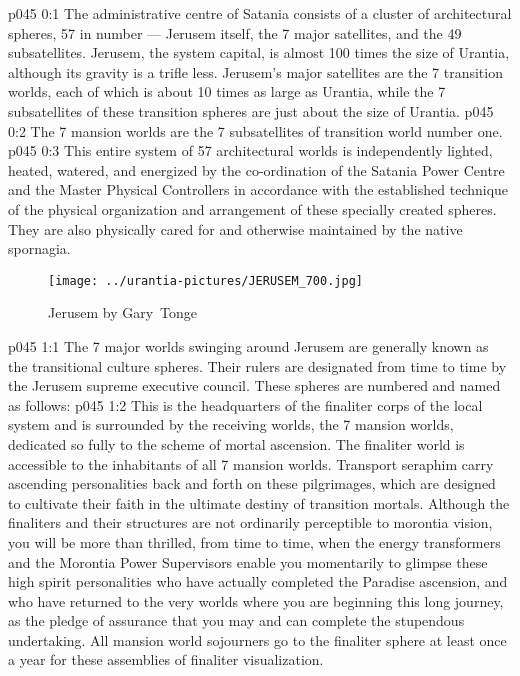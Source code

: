 \author{Melchizedek}
\vs p045 0:1 The administrative centre of Satania consists of a cluster of architectural spheres, 57 in number --- Jerusem itself, the 7 major satellites, and the 49 subsatellites. Jerusem, the system capital, is almost 100 times the size of Urantia, although its gravity is a trifle less. Jerusem’s major satellites are the 7 transition worlds, each of which is about 10 times as large as Urantia, while the 7 subsatellites of these transition spheres are just about the size of Urantia.
\vs p045 0:2 The 7 mansion worlds are the 7 subsatellites of transition world number one.
\vs p045 0:3 This entire system of 57 architectural worlds is independently lighted, heated, watered, and energized by the co\hyp{}ordination of the Satania Power Centre and the Master Physical Controllers in accordance with the established technique of the physical organization and arrangement of these specially created spheres. They are also physically cared for and otherwise maintained by the native spornagia.
\begin{figure}[H]
\centering
\texttt{[image: ../urantia-pictures/JERUSEM\_700.jpg]}
\caption{Jerusem by Gary~Tonge}
\end{figure}
\vs p045 1:1 The 7 major worlds swinging around Jerusem are generally known as the transitional culture spheres. Their rulers are designated from time to time by the Jerusem supreme executive council. These spheres are numbered and named as follows:
\vs p045 1:2 \pc {} This is the headquarters of the finaliter corps of the local system and is surrounded by the receiving worlds, the 7 mansion worlds, dedicated so fully to the scheme of mortal ascension. The finaliter world is accessible to the inhabitants of all 7 mansion worlds. Transport seraphim carry ascending personalities back and forth on these pilgrimages, which are designed to cultivate their faith in the ultimate destiny of transition mortals. Although the finaliters and their structures are not ordinarily perceptible to morontia vision, you will be more than thrilled, from time to time, when the energy transformers and the Morontia Power Supervisors enable you momentarily to glimpse these high spirit personalities who have actually completed the Paradise ascension, and who have returned to the very worlds where you are beginning this long journey, as the pledge of assurance that you may and can complete the stupendous undertaking. All mansion world sojourners go to the finaliter sphere at least once a year for these assemblies of finaliter visualization.
